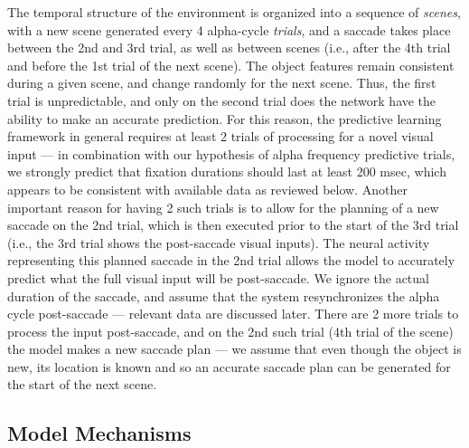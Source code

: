\documentclass[11pt,twoside]{article}
\newif\myifpdf
\begin{document}
The temporal structure of the environment is organized into a sequence of {\em scenes}, with a new scene generated every 4 alpha-cycle {\em trials}, and a saccade takes place between the 2nd and 3rd trial, as well as between scenes (i.e., after the 4th trial and before the 1st trial of the next scene).  The object features remain consistent during a given scene, and change randomly for the next scene.  Thus, the first trial is unpredictable, and only on the second trial does the network have the ability to make an accurate prediction.  For this reason, the predictive learning framework in general requires at least 2 trials of processing for a novel visual input --- in combination with our hypothesis of alpha frequency predictive trials, we strongly predict that fixation durations should last at least 200 msec, which appears to be consistent with available data as reviewed below.  Another important reason for having 2 such trials is to allow for the planning of a new saccade on the 2nd trial, which is then executed prior to the start of the 3rd trial (i.e., the 3rd trial shows the post-saccade visual inputs).  The neural activity representing this planned saccade in the 2nd trial allows the model to accurately predict what the full visual input will be post-saccade.  We ignore the actual duration of the saccade, and assume that the system resynchronizes the alpha cycle post-saccade --- relevant data are discussed later.  There are 2 more trials to process the input post-saccade, and on the 2nd such trial (4th trial of the scene) the model makes a new saccade plan --- we assume that even though the object is new, its location is known and so an accurate saccade plan can be generated for the start of the next scene.

\subsection{Model Mechanisms}
\end{document}
